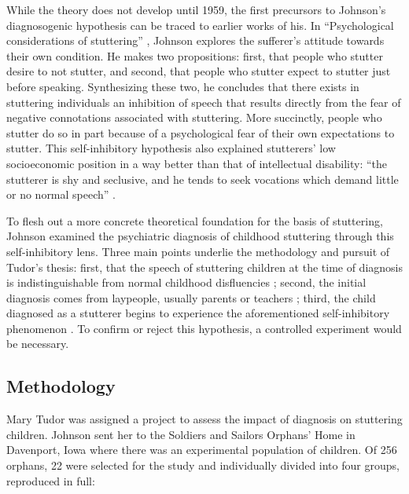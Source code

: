 \documentclass[american]{../../../coursework}
\begin{document}
While the theory does not develop until 1959, the first precursors to
Johnson's diagnosogenic hypothesis can be traced to earlier works of
his. In ``Psychological considerations of stuttering'' \parencite*{Joh36}, Johnson
explores the sufferer's attitude towards their own condition. He makes
two propositions: first, that people who stutter desire to not stutter,
and second, that people who stutter expect to stutter just before
speaking. Synthesizing these two, he concludes that there exists in
stuttering individuals an inhibition of speech that results directly
from the fear of negative connotations associated with stuttering. More
succinctly, people who stutter do so in part because of a psychological
fear of their own expectations to stutter. This self-inhibitory
hypothesis also explained stutterers' low socioeconomic position in a
way better than that of intellectual disability: ``the stutterer is shy
and seclusive, and he tends to seek vocations which demand little or no
normal speech'' \parencite[23]{Joh36}.

To flesh out a more concrete theoretical foundation for the basis of
stuttering, Johnson examined the psychiatric diagnosis of childhood
stuttering through this self-inhibitory lens. Three main points underlie
the methodology and pursuit of Tudor's thesis: first, that the speech of
stuttering children at the time of diagnosis is indistinguishable from
normal childhood disfluencies \parencite{GoldfarbEthics02}; second, the initial
diagnosis comes from laypeople, usually parents or teachers \parencite{Joh42};
third, the child diagnosed as a stutterer begins to experience
the aforementioned self-inhibitory phenomenon \parencite{Joh36}. To
confirm or reject this hypothesis, a controlled experiment would be
necessary.

\subsection{Methodology}

Mary Tudor was assigned a project to assess the impact of diagnosis on
stuttering children. Johnson sent her to the Soldiers and Sailors
Orphans' Home in Davenport, Iowa where there was an experimental
population of children. Of 256 orphans, 22 were selected for the study
and individually divided into four groups, reproduced in full:
\end{document}
